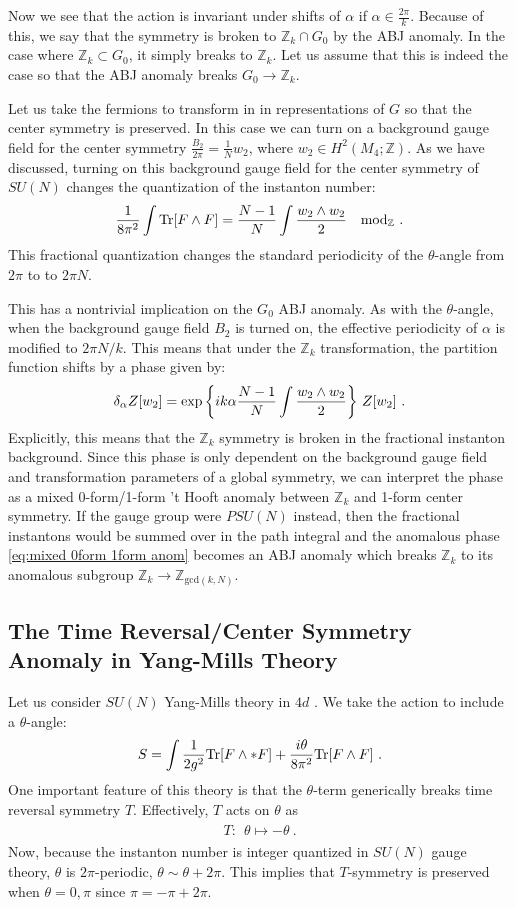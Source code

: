 \documentclass[11pt]{article}
\newcommand{\eq}[1]{\begin{align}\begin{split}#1\end{split}\end{align}}
\newcommand{\twopi}[1]{{\frac{#1}{2\pi}}}
\def\Tr{{\rm Tr}}
\def\IZ{{\mathbb{Z}}}
\begin{document}
Now we see that the action is invariant under shifts of $\alpha$ if $\alpha\in \frac{2\pi}{k}$. Because of this, we say that the symmetry is broken to $\IZ_k\cap G_0$ by the ABJ anomaly. In the case where $\IZ_k\subset G_0$, it simply breaks to $\IZ_k$. Let us assume that this is indeed the case so that the ABJ anomaly breaks $G_0\to \IZ_k$. 

Let us take the fermions to transform in in representations of $G$ so that the center symmetry is preserved. In this case we can turn on a background gauge field for the center symmetry $\twopi{B_2}=\frac{1}{N}w_2$, where $w_2\in H^2(M_4;\IZ)$. As we have discussed, turning on this background gauge field for the center symmetry of $SU(N)$ changes the quantization of the instanton number:
\eq{
\frac{1}{8\pi^2}\int \Tr[F\wedge F]= \frac{N-1}{N}\int \frac{w_2\wedge w_2}{2}\quad {\rm mod}_\IZ~.
}
This fractional quantization changes the standard periodicity of the $\theta$-angle from $2\pi$ to  to $2\pi N$. 

This has a nontrivial implication on the $G_0$ ABJ anomaly.  As with the $\theta$-angle, when the background gauge field $B_2$ is turned on, the effective periodicity of $\alpha$ is modified to $2\pi N/k$. This means that under the $\IZ_k$ transformation, the partition function shifts by a phase given by:
\eq{
\delta_\alpha Z[w_2]={\rm exp}\left\{ik\alpha \frac{N-1}{N}\int \frac{w_2\wedge w_2}{2}\right\}\,Z[w_2]~.
\label{eq:mixed 0form 1form anom}
}%
Explicitly, this means that the $\IZ_k$ symmetry is broken in the fractional instanton background.  
Since this phase is only dependent on the background gauge field and transformation parameters of a global symmetry, we can interpret the phase as a mixed 0-form/1-form 't Hooft anomaly between $\IZ_k$ and 1-form center symmetry. If the gauge group were $PSU(N)$ instead, then the fractional instantons would be summed over in the path integral and the anomalous phase  \eqref{eq:mixed 0form 1form anom} becomes an ABJ anomaly which breaks $\IZ_k$ to its anomalous subgroup $\IZ_k\to \IZ_{\text{gcd} (k, N)}$. 


\subsection{The Time Reversal/Center Symmetry Anomaly in Yang-Mills Theory}

Let us consider $SU(N)$ Yang-Mills theory in $4d$ . We take the action to include a $\theta$-angle:
\eq{
S=\int \frac{1}{2g^2}\Tr[F\wedge \ast F]+\frac{i \theta}{8\pi^2}\Tr[F\wedge F]~. 
}
One important  feature of this theory is that the $\theta$-term generically breaks time reversal symmetry $T$. Effectively, $T$ acts on $\theta$ as
\eq{
T:~~\theta\longmapsto -\theta~.
}
Now, because the instanton number is integer quantized in $SU(N)$ gauge theory, $\theta$ is $2\pi$-periodic, $\theta\sim \theta+2\pi$. This implies that  $T$-symmetry is  preserved when $\theta=0,\pi$ since $\pi=-\pi+2\pi$. 
\end{document}
